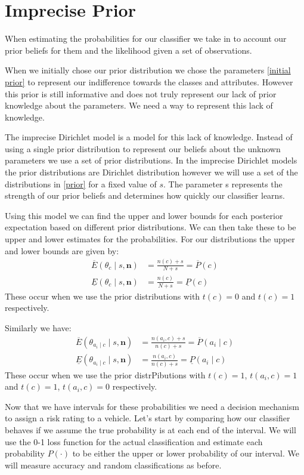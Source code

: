 \chapter{Imprecise Prior}

When estimating the probabilities for our classifier we take in to account our prior beliefs for them and the likelihood given a set of observations.

When we initially chose our prior distribution we chose the parameters \cref{initial prior} to represent our indifference towards the classes and attributes.
However this prior is still informative and does not truly represent our lack of prior knowledge about the parameters.
We need a way to represent this lack of knowledge.

The imprecise Dirichlet model is a model for this lack of knowledge.
Instead of using a single prior distribution to represent our beliefs about the unknown parameters we use a set of prior distributions.
In the imprecise Dirichlet models the prior distributions are Dirichlet distribution however we will use a set of the distributions in \cref{prior} for a fixed value of $s$.
The parameter s represents the strength of our prior beliefs and determines how quickly our classifier learns.

Using this model we can find the upper and lower bounds for each posterior expectation based on different prior distributions.
We can then take these to be upper and lower estimates for the probabilities.
For our distributions the upper and lower bounds are given by:
\begin{align}
	\overline{E}(\theta_c \mid s, \mathbf{n}) & = \frac{n(c) + s}{N+s} = \overline{P}(c) \\
	\underline{E}(\theta_c \mid s, \mathbf{n}) & = \frac{n(c)}{N+s} = \underline{P}(c)
\end{align}
These occur when we use the prior distributions with $t(c) = 0$ and $t(c) = 1$ respectively.

Similarly we have:
\begin{align}
	\overline{E}(\theta_{a_i \mid c} \mid s, \mathbf{n}) & = \frac{n(a_i, c) + s}{n(c)+s} = \overline{P}(a_i \mid c) \\
	\underline{E}(\theta_{a_i \mid c} \mid s, \mathbf{n}) & = \frac{n(a_i, c)}{n(c)+s} = \underline{P}(a_i \mid c)
\end{align}
These occur when we use the prior distrPibutions with $t(c) = 1$, $t(a_i, c)=1$ and $t(c) = 1$, $t(a_i, c)=0$ respectively.

Now that we have intervals for these probabilities we need a decision mechanism to assign a risk rating to a vehicle.
Let's start by comparing how our classifier behaves if we assume the true probability is at each end of the interval.
We will use the 0-1 loss function for the actual classification and estimate each probability $P(\cdot)$ to be either the upper or lower probability of our interval.
We will measure accuracy and random classifications as before.

